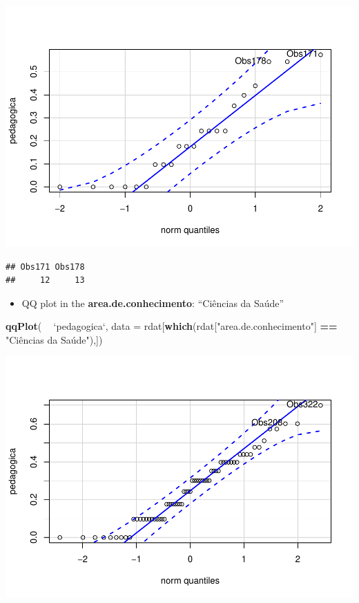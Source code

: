 \documentclass[]{article}
\newenvironment{Shaded}{\begin{snugshade}}{\end{snugshade}}
\newcommand{\DataTypeTok}[1]{\textcolor[rgb]{0.13,0.29,0.53}{#1}}
\newcommand{\KeywordTok}[1]{\textcolor[rgb]{0.13,0.29,0.53}{\textbf{#1}}}
\newcommand{\NormalTok}[1]{#1}
\newcommand{\OperatorTok}[1]{\textcolor[rgb]{0.81,0.36,0.00}{\textbf{#1}}}
\newcommand{\StringTok}[1]{\textcolor[rgb]{0.31,0.60,0.02}{#1}}
\providecommand{\tightlist}{%
  \setlength{\itemsep}{0pt}\setlength{\parskip}{0pt}}
\begin{document}
\includegraphics{factorialAnova_files/figure-latex/unnamed-chunk-13-1.pdf}

\begin{verbatim}
## Obs171 Obs178 
##     12     13
\end{verbatim}

\begin{itemize}
\tightlist
\item
  QQ plot in the \textbf{area.de.conhecimento}: ``Ciências da Saúde''
\end{itemize}

\begin{Shaded}
\begin{Highlighting}[]
\KeywordTok{qqPlot}\NormalTok{( }\OperatorTok{~}\StringTok{ `}\DataTypeTok{pedagogica}\StringTok{`}\NormalTok{, }\DataTypeTok{data =}\NormalTok{ rdat[}\KeywordTok{which}\NormalTok{(rdat[}\StringTok{"area.de.conhecimento"}\NormalTok{] }\OperatorTok{==}\StringTok{ "Ciências da Saúde"),])}
\end{Highlighting}
\end{Shaded}

\includegraphics{factorialAnova_files/figure-latex/unnamed-chunk-14-1.pdf}
\end{document}
